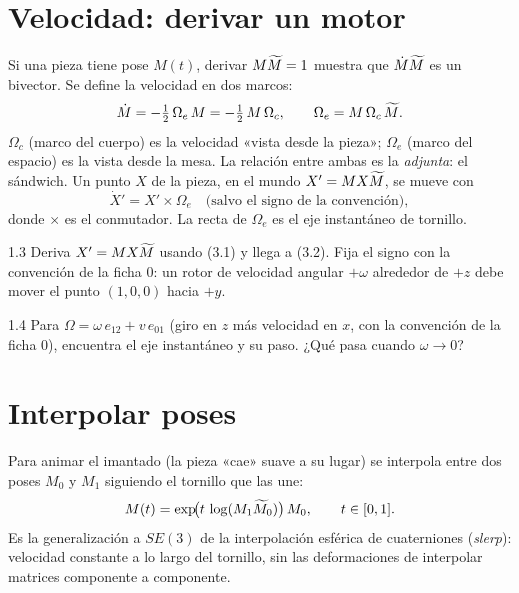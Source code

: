 \documentclass[11pt,a4paper]{article}
\begin{document}
\section{Velocidad: derivar un motor}

Si una pieza tiene pose $M(t)$, derivar $M\widetilde{M} = 1$ muestra que $\dot M \widetilde{M}$ es un bivector. Se define la
velocidad en dos marcos:
\begin{equation}
  \dot M = -\tfrac12\,\Omega_e\,M = -\tfrac12\,M\,\Omega_c, \qquad \Omega_e = M\,\Omega_c\,\widetilde{M} .
\end{equation}
$\Omega_c$ (marco del cuerpo) es la velocidad «vista desde la pieza»; $\Omega_e$ (marco del espacio) es la vista desde
la mesa. La relación entre ambas es la \emph{adjunta}: el sándwich. Un punto $X$ de la pieza, en el mundo
$X' = MX\widetilde{M}$, se mueve con
\begin{equation}
  \dot X' = X'\times\Omega_e \quad\text{(salvo el signo de la convención)},
\end{equation}
donde $\times$ es el conmutador. La recta de $\Omega_e$ es el eje instantáneo de tornillo.

\begin{ejercicio}{1.3}
Deriva $X' = M X \widetilde{M}$ usando (3.1) y llega a (3.2). Fija el signo con la convención de la ficha 0: un rotor de
velocidad angular $+\omega$ alrededor de $+z$ debe mover el punto $(1,0,0)$ hacia $+y$.
\end{ejercicio}

\begin{ejercicio}{1.4}
Para $\Omega = \omega\,e_{12} + v\,e_{01}$ (giro en $z$ más velocidad en $x$, con la convención de la ficha 0),
encuentra el eje instantáneo y su paso. ¿Qué pasa cuando $\omega \to 0$?
\end{ejercicio}

\section{Interpolar poses}

Para animar el imantado (la pieza «cae» suave a su lugar) se interpola entre dos poses $M_0$ y $M_1$ siguiendo el
tornillo que las une:
\begin{equation}
  M(t) = \exp\!\bigl(t\,\log(M_1\widetilde{M}_0)\bigr)\,M_0,\qquad t\in[0,1].
\end{equation}
Es la generalización a $SE(3)$ de la interpolación esférica de cuaterniones (\emph{slerp}): velocidad constante a lo
largo del tornillo, sin las deformaciones de interpolar matrices componente a componente.
\end{document}
